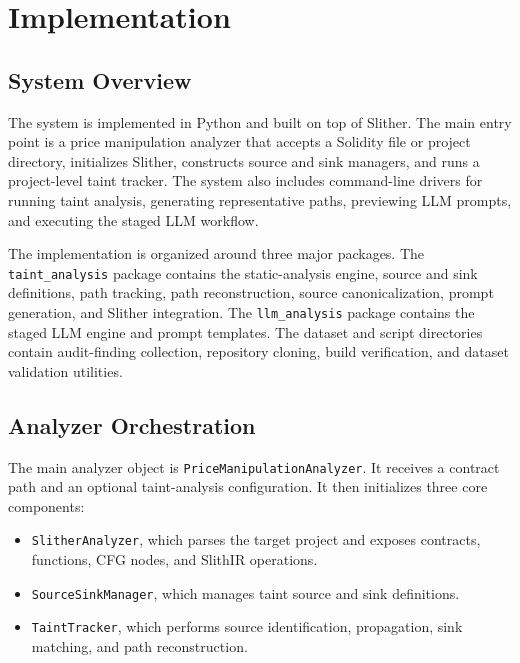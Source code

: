 
\chapter{Implementation}

\section{System Overview}

The system is implemented in Python and built on top of Slither. The main
entry point is a price manipulation analyzer that accepts a Solidity file or
project directory, initializes Slither, constructs source and sink managers, and
runs a project-level taint tracker. The system also includes command-line
drivers for running taint analysis, generating representative paths, previewing
LLM prompts, and executing the staged LLM workflow.

The implementation is organized around three major packages. The
\texttt{taint\_analysis} package contains the static-analysis engine, source and
sink definitions, path tracking, path reconstruction, source canonicalization,
prompt generation, and Slither integration. The \texttt{llm\_analysis} package
contains the staged LLM engine and prompt templates. The dataset and script
directories contain audit-finding collection, repository cloning, build
verification, and dataset validation utilities.

\section{Analyzer Orchestration}

The main analyzer object is \texttt{PriceManipulationAnalyzer}. It receives a
contract path and an optional taint-analysis configuration. It then initializes
three core components:

\begin{itemize}
  \item \texttt{SlitherAnalyzer}, which parses the target project and exposes
        contracts, functions, CFG nodes, and SlithIR operations.
  \item \texttt{SourceSinkManager}, which manages taint source and sink
        definitions.
  \item \texttt{TaintTracker}, which performs source identification,
        propagation, sink matching, and path reconstruction.
\end{itemize}

